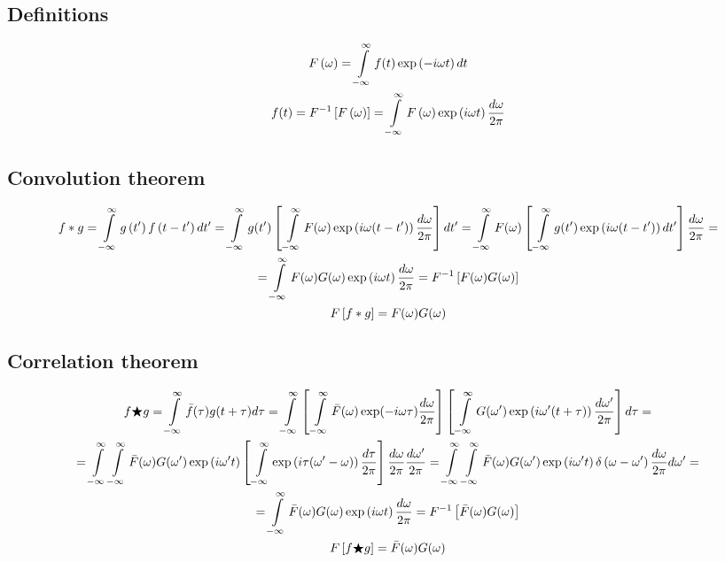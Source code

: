 \documentclass[14pt]{article}
\newcommand{\lb}{\left(}
\newcommand{\rb}{\right)}
\newcommand{\intty}{\int\limits_{-\infty}^{\infty}}
\begin{document}
\subsection*{Definitions}

\begin{gather}
F \lb \omega \rb = \int\limits_{-\infty}^{\infty} f(t) \exp \lb - i \omega t \rb d t \notag \\
f(t) = F^{-1} \left[ F \lb \omega \rb \right] = \int\limits_{-\infty}^{\infty} F \lb \omega \rb \exp \lb i \omega t \rb \frac{d \omega}{2 \pi} \notag
\end{gather}


\subsection*{Convolution theorem}

\begin{gather}
	f * g = \intty g \lb t^\prime \rb f \lb t - t^\prime \rb d t^\prime = \intty g(t^\prime) \left[ \, \intty F(\omega) \exp \lb i \omega (t - t^\prime) \rb \frac{d \omega}{2 \pi} \right] d t^\prime = \intty F(\omega) \left[ \, \intty g(t^\prime) \exp \lb i \omega (t - t^\prime) \rb d t^\prime \right] \frac{d \omega}{2 \pi}  = \notag \\ 
	= \intty F(\omega) G(\omega) \exp \lb i \omega t \rb \frac{d \omega}{2 \pi} = F^{-1} \left[ F(\omega) G(\omega) \right] \notag \\
	F \left[ f * g \right] = F(\omega) G(\omega) \notag
\end{gather}


\subsection*{Correlation theorem}

\begin{gather}
	f \bigstar g = \intty \bar{f}(\tau) g(t + \tau) d \tau = \intty \left[ \, \intty \bar{F}(\omega) \exp(-i \omega \tau) \frac{d \omega}{2 \pi} \right] \left[ \, \intty G(\omega^\prime) \exp \lb i \omega^\prime ( t + \tau) \rb \frac{d \omega^\prime}{2 \pi} \right] d \tau = \notag \\
	= \intty \intty \bar{F}(\omega) G(\omega^\prime) \exp \lb i \omega^\prime t \rb \left[ \, \intty \exp \lb i \tau (\omega^\prime - \omega) \rb \frac{d \tau}{2 \pi} \right] \frac{d \omega}{2 \pi} \frac{d \omega^\prime}{2 \pi} = \intty \intty \bar{F}(\omega)G(\omega^\prime) \exp \lb i \omega^\prime t \rb  \delta \lb \omega - \omega^\prime \rb \frac{d \omega}{2 \pi} d \omega^\prime = \notag \\
	= \intty \bar{F}(\omega) G(\omega) \exp \lb i \omega t \rb \frac{d \omega}{2 \pi} = F^{-1} \left[ \bar{F}(\omega) G(\omega) \right] \notag \\
	F \left[ f \bigstar g \right] = \bar{F}(\omega) G(\omega) \notag
\end{gather}
\end{document}
